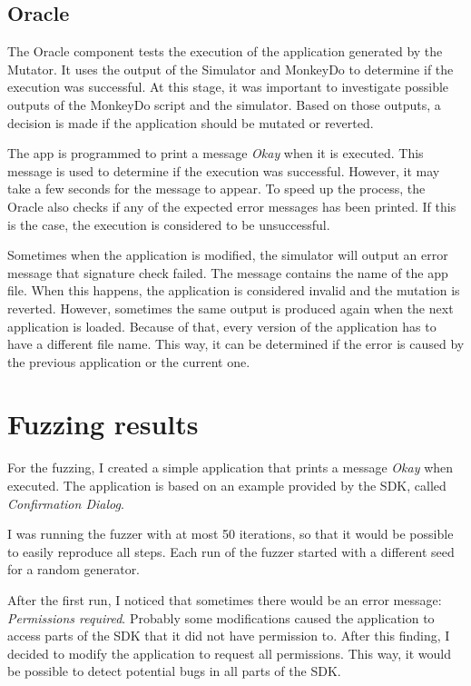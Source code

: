 \subsection*{Oracle}
The Oracle component tests the execution of the application generated by the Mutator.
It uses the output of the Simulator and MonkeyDo to determine if the execution was successful.
At this stage, it was important to investigate possible outputs of the MonkeyDo script and the simulator.
Based on those outputs, a decision is made if the application should be mutated or reverted.

The app is programmed to print a message \textit{Okay} when it is executed.
This message is used to determine if the execution was successful.
However, it may take a few seconds for the message to appear.
To speed up the process, the Oracle also checks if any of the expected error messages has been printed.
If this is the case, the execution is considered to be unsuccessful.

Sometimes when the application is modified, the simulator will output an error message that signature check failed.
The message contains the name of the app file.
When this happens, the application is considered invalid and the mutation is reverted.
However, sometimes the same output is produced again when the next application is loaded.
Because of that, every version of the application has to have a different file name.
This way, it can be determined if the error is caused by the previous application or the current one.


\section{Fuzzing results}

For the fuzzing, I created a simple application that prints a message \textit{Okay} when executed.
The application is based on an example provided by the SDK, called \textit{Confirmation Dialog}.

I was running the fuzzer with at most 50 iterations, so that it would be possible to easily reproduce all steps.
Each run of the fuzzer started with a different seed for a random generator.

After the first run, I noticed that sometimes there would be an error message: \textit{Permissions required}.
Probably some modifications caused the application to access parts of the SDK that it did not have permission to.
After this finding, I decided to modify the application to request all permissions.
This way, it would be possible to detect potential bugs in all parts of the SDK\@.

